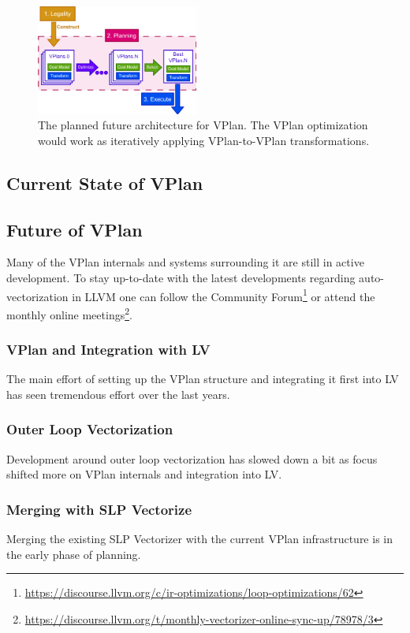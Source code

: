 \documentclass[sigplan,11pt,nonacm]{acmart}
\begin{document}
\begin{figure}
  \centering
  \includegraphics[width=0.475\textwidth]{images/vplan-future.png}
  \caption{The planned future architecture for VPlan. The VPlan optimization would
  work as iteratively applying VPlan-to-VPlan transformations.}
  \label{fig:vplan-future}
\end{figure}

\subsection{Current State of VPlan}



\subsection{Future of VPlan}
Many of the VPlan internals and systems surrounding it are still in active development. To stay
up-to-date with the latest developments regarding auto-vectorization in LLVM one can follow the 
Community Forum\footnote{\url{https://discourse.llvm.org/c/ir-optimizations/loop-optimizations/62}} or
attend the monthly online 
meetings\footnote{\url{https://discourse.llvm.org/t/monthly-vectorizer-online-sync-up/78978/3}}.

\subsubsection{VPlan and Integration with LV}
The main effort of setting up the VPlan structure and integrating it first into LV has seen
tremendous effort over the last years. 

\subsubsection{Outer Loop Vectorization}
Development around outer loop vectorization has slowed down a bit as focus shifted more on VPlan
internals and integration into LV. 

\subsubsection{Merging with SLP Vectorize}
Merging the existing SLP Vectorizer with the current VPlan infrastructure is in the early phase
of planning.
\end{document}
